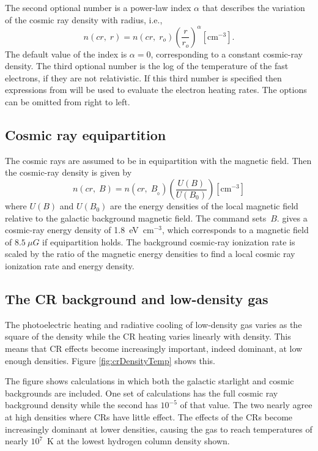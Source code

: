 The second optional number is a power-law index $\alpha $ that
describes the
variation of the cosmic ray density with radius, i.e.,
\begin{equation}
n\left( {cr,\;r} \right) = n\left( {cr,\;r_o } \right)\left( {\frac{r}{{r_o
}}} \right)^\alpha
 [\mathrm{cm}^{-3}]  .
\end{equation}
The default value of the index is  $\alpha =0$,
corresponding to a constant cosmic-ray density.
The third optional number is the log of the temperature of
the fast electrons, if they are not relativistic.
If this third number
is specified then expressions from \citet{Balbus1982} will be used
to evaluate the electron heating rates.
The options can be omitted from right to left.

\subsection{Cosmic ray equipartition}

The cosmic rays are assumed to be in equipartition with the magnetic
field.
Then the cosmic-ray density is given by
\begin{equation}
n\left( {cr,\;B} \right) = n\left( {cr,\;B_{_0 } } \right)\left(
{\frac{{U\left( B \right)}}{{U\left( {B_0 } \right)}}} \right)
[\mathrm{cm}^{-3}]%
\end{equation}
where $U(B)$ and $U(B_0)$ are the energy densities of the local
magnetic field
relative to the galactic background magnetic field.
The 
command sets~$B$.  \citet{Webber1998} gives a cosmic-ray
energy density of 1.8~eV~cm$^{-3}$,
which corresponds to a magnetic field of
$8.5~\mu G$ if equipartition holds.
The background cosmic-ray ionization rate
is scaled by the ratio of the magnetic energy densities to find a local
cosmic ray ionization rate and energy density.

\subsection{The CR background and low-density gas}

The photoelectric heating and radiative cooling of low-density gas varies as the
square of the density while the CR heating varies linearly with density.
This means that CR effects become increasingly important, indeed dominant,
at low enough densities.
Figure \ref{fig:crDensityTemp} shows this.

The figure shows calculations in which both the galactic starlight and cosmic backgrounds 
are included.  
One set of calculations has the full cosmic ray background density while the second
has $10^{-5}$ of that value.  
The two nearly agree at high densities where CRs have little effect.
The effects of the CRs become increasingly dominant at lower densities, causing
the gas to reach temperatures of nearly $10^7$~K at the lowest hydrogen column density shown.

